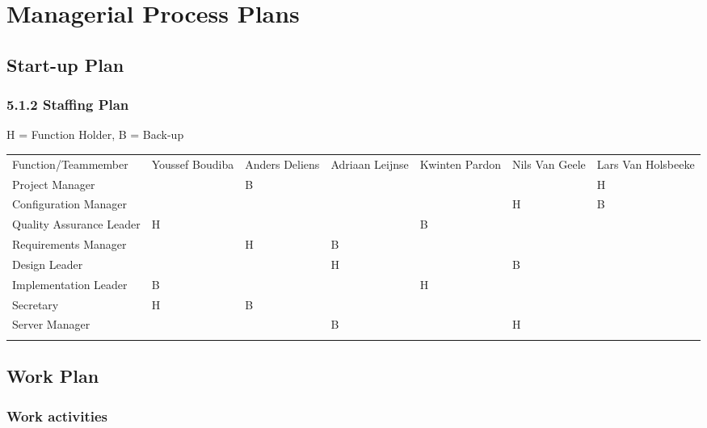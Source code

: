 \documentclass[9pt]{article}
\begin{document}
\section{Managerial Process Plans}\label{managerial-process-plans}

\subsection{Start-up Plan}\label{start-up-plan}

\subsubsection{5.1.2 Staffing Plan}\label{staffing-plan}

 H = Function Holder, B = Back-up

\begin{longtabu}[c]{@{}lXXXXXX@{}}
\hline\noalign{\medskip}
Function/Teammember & Youssef Boudiba & Anders Deliens & Adriaan Leijnse
& Kwinten Pardon & Nils Van Geele & Lars Van Holsbeeke
\\\noalign{\medskip}
\hline\noalign{\medskip}
Project Manager & & B & & & & H
\\\noalign{\medskip}
Configuration Manager & & & & & H & B
\\\noalign{\medskip}
Quality Assurance Leader & H & & & B &
\\\noalign{\medskip}
Requirements Manager & & H & B & &
\\\noalign{\medskip}
Design Leader & & & H & & B
\\\noalign{\medskip}
Implementation Leader & B & & & H &
\\\noalign{\medskip}
Secretary & H & B & & &
\\\noalign{\medskip}
Server Manager & & & B & & H
\\\noalign{\medskip}
\hline
\end{longtabu}

\subsection{Work Plan}\label{work-plan}

\subsubsection{Work activities}\label{work-activities}
\end{document}
